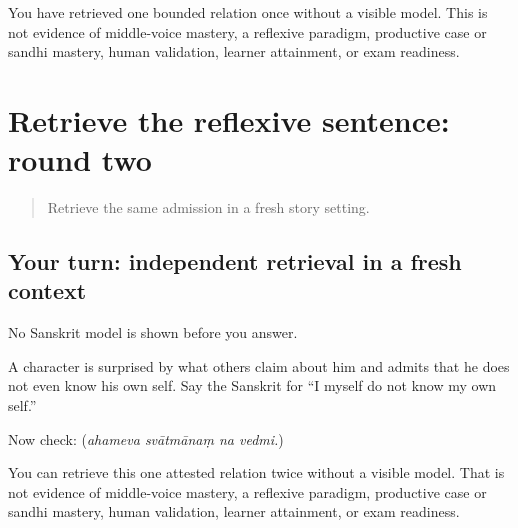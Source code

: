 \begin{tcolorbox}[breakable,colback=teal!4,colframe=teal!35!black,title={Before you move on}]
You have retrieved one bounded relation once without a visible model. This is not evidence of middle-voice mastery, a reflexive paradigm, productive case or sandhi mastery, human validation, learner attainment, or exam readiness.
\end{tcolorbox}
\section[(independent reflexive-sentence …]{Retrieve the reflexive sentence: round two}

\label{lesson:SA-C273-reflexive-final-retrieval}



\begin{quote}
Retrieve the same admission in a fresh story setting.
\end{quote}

\subsection*{Your turn: independent retrieval in a fresh context}
No Sanskrit model is shown before you answer.

A character is surprised by what others claim about him and admits that he does not even know his own self. Say the Sanskrit for “I myself do not know my own self.”

\begin{grammarlens}[title={What you've built: check after answering}]
Now check: \textbf{   } (\emph{ahameva svātmānaṃ na vedmi.})
\end{grammarlens}

\begin{tcolorbox}[breakable,colback=teal!4,colframe=teal!35!black,title={Before you move on}]
You can retrieve this one attested relation twice without a visible model. That is not evidence of middle-voice mastery, a reflexive paradigm, productive case or sandhi mastery, human validation, learner attainment, or exam readiness.
\end{tcolorbox}
